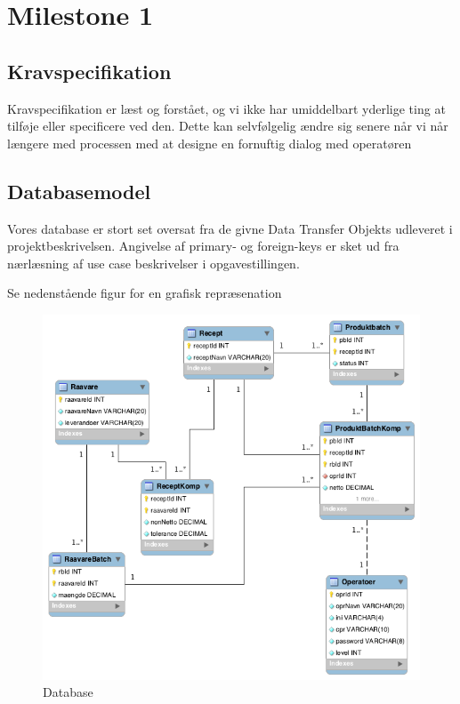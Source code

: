 \documentclass[a4paper]{article}
\begin{document}

\clearpage

\section{Milestone 1} %
\label{sec:Milestone 1}

\subsection{Kravspecifikation} %
\label{sub:Kravspecifikation}

Kravspecifikation er læst og forstået, og vi ikke har umiddelbart yderlige ting at tilføje eller specificere ved den. Dette kan selvfølgelig ændre sig senere når vi når længere med processen med at designe en fornuftig dialog med operatøren


\subsection{Databasemodel} %
\label{sub:Databasemodel}

Vores database er stort set oversat fra de givne Data Transfer Objekts udleveret i projektbeskrivelsen. Angivelse af primary- og foreign-keys er sket ud fra nærlæsning af use case beskrivelser i opgavestillingen.

Se nedenstående figur for en grafisk repræsenation

\begin{figure}[H]
  \centering
  \includegraphics[scale=0.6]{graphics/db.png}
    \caption{Database}
\end{figure}
\end{document}
